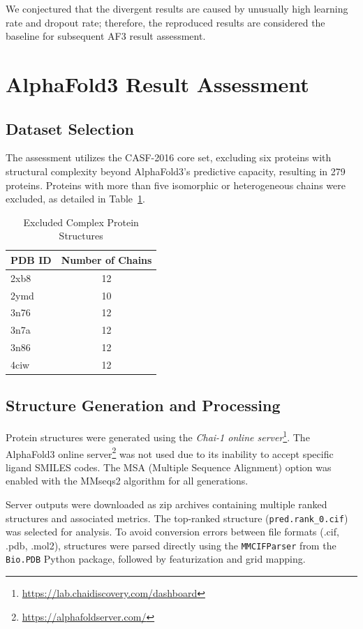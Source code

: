 \documentclass[unnumsec,webpdf,contemporary,large]{oup-authoring-template}
\theoremstyle{thmstyleone}%
\theoremstyle{thmstyletwo}%
\theoremstyle{thmstylethree}%
\begin{document}
We conjectured that the divergent results are caused by unusually high learning rate and dropout rate;
therefore, the reproduced results are considered the baseline for subsequent AF3 result assessment.

\section{AlphaFold3 Result Assessment}

\subsection{Dataset Selection}
The assessment utilizes the CASF-2016 core set, excluding six proteins with structural complexity beyond AlphaFold3's predictive capacity, resulting in 279 proteins. Proteins with more than five isomorphic or heterogeneous chains were excluded, as detailed in Table~\ref{tab:complex}.

\begin{table}[H]
\centering
\caption{Excluded Complex Protein Structures}
\label{tab:complex}
\begin{tabular}{lc}
\toprule
PDB ID & Number of Chains \\
\midrule
2xb8 & 12 \\
2ymd & 10 \\
3n76 & 12 \\
3n7a & 12 \\
3n86 & 12 \\
4ciw & 12 \\
\bottomrule
\end{tabular}
\end{table}

\subsection{Structure Generation and Processing}
Protein structures were generated using the \textit{Chai-1 online server}\footnote{\url{https://lab.chaidiscovery.com/dashboard}}. The AlphaFold3 online server\footnote{\url{https://alphafoldserver.com/}} was not used due to its inability to accept specific ligand SMILES codes. The MSA (Multiple Sequence Alignment) option was enabled with the MMseqs2 algorithm for all generations.

Server outputs were downloaded as zip archives containing multiple ranked structures and associated metrics. The top-ranked structure (\texttt{pred.rank\_0.cif}) was selected for analysis. To avoid conversion errors between file formats (.cif, .pdb, .mol2), structures were parsed directly using the \texttt{MMCIFParser} from the \texttt{Bio.PDB} Python package, followed by featurization and grid mapping.
\end{document}
